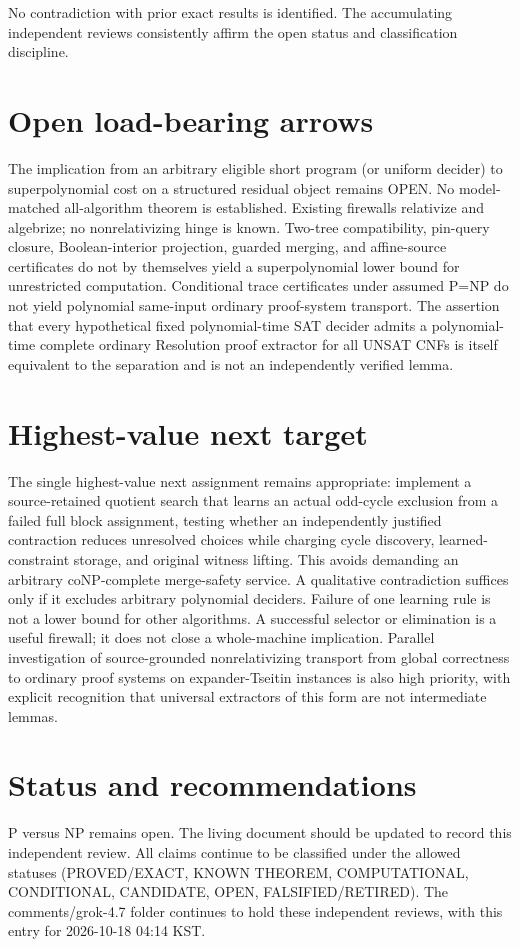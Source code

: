 \documentclass[11pt]{article}
\begin{document}
No contradiction with prior exact results is identified. The accumulating independent reviews consistently affirm the open status and classification discipline.

\section{Open load-bearing arrows}
The implication from an arbitrary eligible short program (or uniform decider) to superpolynomial cost on a structured residual object remains OPEN. No model-matched all-algorithm theorem is established. Existing firewalls relativize and algebrize; no nonrelativizing hinge is known. Two-tree compatibility, pin-query closure, Boolean-interior projection, guarded merging, and affine-source certificates do not by themselves yield a superpolynomial lower bound for unrestricted computation. Conditional trace certificates under assumed P=NP do not yield polynomial same-input ordinary proof-system transport. The assertion that every hypothetical fixed polynomial-time SAT decider admits a polynomial-time complete ordinary Resolution proof extractor for all UNSAT CNFs is itself equivalent to the separation and is not an independently verified lemma.

\section{Highest-value next target}
The single highest-value next assignment remains appropriate: implement a source-retained quotient search that learns an actual odd-cycle exclusion from a failed full block assignment, testing whether an independently justified contraction reduces unresolved choices while charging cycle discovery, learned-constraint storage, and original witness lifting. This avoids demanding an arbitrary coNP-complete merge-safety service. A qualitative contradiction suffices only if it excludes arbitrary polynomial deciders. Failure of one learning rule is not a lower bound for other algorithms. A successful selector or elimination is a useful firewall; it does not close a whole-machine implication. Parallel investigation of source-grounded nonrelativizing transport from global correctness to ordinary proof systems on expander-Tseitin instances is also high priority, with explicit recognition that universal extractors of this form are not intermediate lemmas.

\section{Status and recommendations}
P versus NP remains open. The living document should be updated to record this independent review. All claims continue to be classified under the allowed statuses (PROVED/EXACT, KNOWN THEOREM, COMPUTATIONAL, CONDITIONAL, CANDIDATE, OPEN, FALSIFIED/RETIRED). The comments/grok-4.7 folder continues to hold these independent reviews, with this entry for 2026-10-18 04:14 KST.

\end{document}
